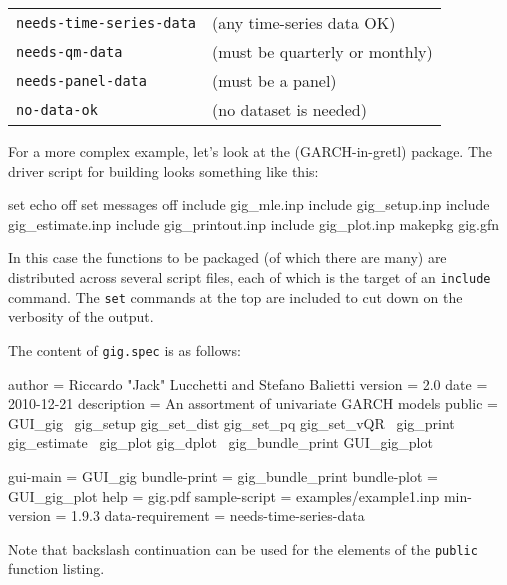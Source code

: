 \begin{center}
\begin{tabular}{ll}
\texttt{needs-time-series-data} & (any time-series data OK) \\ 
\texttt{needs-qm-data} & (must be quarterly or monthly) \\ 
\texttt{needs-panel-data} & (must be a panel) \\
\texttt{no-data-ok} & (no dataset is needed) \\
\end{tabular}
\end{center}

For a more complex example, let's look at the 
(GARCH-in-gretl) package.  The driver script for building 
looks something like this:
%
\begin{code}
set echo off
set messages off
include gig_mle.inp
include gig_setup.inp
include gig_estimate.inp
include gig_printout.inp
include gig_plot.inp
makepkg gig.gfn
\end{code}

In this case the functions to be packaged (of which there are many)
are distributed across several script files, each of which is the
target of an \texttt{include} command.  The \texttt{set} commands at
the top are included to cut down on the verbosity of the output.

The content of \texttt{gig.spec} is as follows:
%
\begin{code}
author = Riccardo "Jack" Lucchetti and Stefano Balietti
version = 2.0
date = 2010-12-21
description = An assortment of univariate GARCH models
public = GUI_gig \
    gig_setup gig_set_dist gig_set_pq gig_set_vQR \
    gig_print gig_estimate \
    gig_plot gig_dplot \
    gig_bundle_print GUI_gig_plot

gui-main = GUI_gig
bundle-print = gig_bundle_print
bundle-plot = GUI_gig_plot
help = gig.pdf
sample-script = examples/example1.inp
min-version = 1.9.3
data-requirement = needs-time-series-data
\end{code}

Note that backslash continuation can be used for the elements of the
\texttt{public} function listing.

